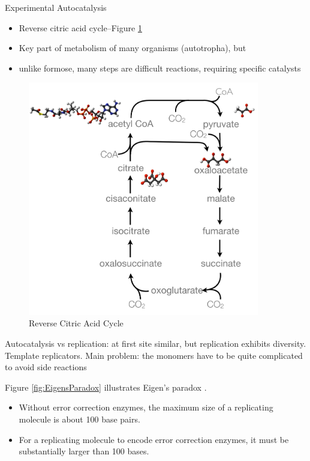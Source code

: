 \documentclass[]{article}
\begin{document}
Experimental Autocatalysis \cite{carnall2010mechanosensitive}

\begin{itemize}
	\item Reverse citric acid cycle--Figure \ref{fig:ReverseCitricAcidCycle}
	\item Key part of metabolism of many organisms (autotropha), but 
	\item unlike formose, many steps are difficult reactions, requiring specific catalysts
\end{itemize}

\begin{figure}[H]
	\caption{Reverse Citric Acid Cycle}\label{fig:ReverseCitricAcidCycle}
	\includegraphics[width=0.9\textwidth]{ReverseCitricAcidCycle}
\end{figure}

Autocatalysis vs replication: at first site similar, but replication exhibits diversity. Template replicators\cite{von1986self}\cite{virgo2012evolvable}. Main problem: the monomers
have to be quite complicated
to avoid side reactions

Figure \ref{fig:EigensParadox} illustrates Eigen's paradox \cite{eigen1971selforganization} \cite{wiki:error-threshold}.
\begin{itemize}
	\item Without error correction enzymes, the maximum size of a replicating molecule is about 100 base pairs.
	\item For a replicating molecule to encode error correction enzymes, it must be substantially larger than 100 bases.
\end{itemize}
\end{document}
